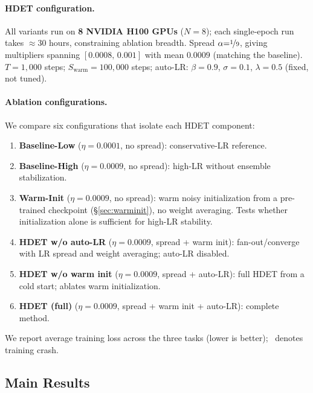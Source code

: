 \documentclass{article}
\begin{document}
\paragraph{HDET configuration.}
All variants run on \textbf{8 NVIDIA H100 GPUs} ($N{=}8$); each single-epoch run
takes ${\approx}30$ hours, constraining ablation breadth.
Spread $\alpha{=}\nicefrac{1}{9}$, giving multipliers spanning $[0.0008,\,0.001]$
with mean $0.0009$ (matching the baseline).
$T{=}1{,}000$ steps; $S_{\mathrm{warm}}{=}100{,}000$ steps;
auto-LR: $\beta{=}0.9$, $\sigma{=}0.1$, $\lambda{=}0.5$ (fixed, not tuned).

\paragraph{Ablation configurations.}
We compare six configurations that isolate each HDET component:

\begin{enumerate}
  \item \textbf{Baseline-Low} ($\eta{=}0.0001$, no spread): conservative-LR reference.
  \item \textbf{Baseline-High} ($\eta{=}0.0009$, no spread): high-LR without ensemble stabilization.
  \item \textbf{Warm-Init} ($\eta{=}0.0009$, no spread): warm noisy initialization
        from a pre-trained checkpoint (\S\ref{sec:warminit}), no weight averaging.
        Tests whether initialization alone is sufficient for high-LR stability.
  \item \textbf{HDET w/o auto-LR} ($\eta{=}0.0009$, spread + warm init):
        fan-out/converge with LR spread and weight averaging; auto-LR disabled.
  \item \textbf{HDET w/o warm init} ($\eta{=}0.0009$, spread + auto-LR):
        full HDET from a cold start; ablates warm initialization.
  \item \textbf{HDET (full)} ($\eta{=}0.0009$, spread + warm init + auto-LR):
        complete method.
\end{enumerate}

We report average training loss across the three tasks (lower is better);
\textdagger~denotes training crash.

\subsection{Main Results}
\end{document}
